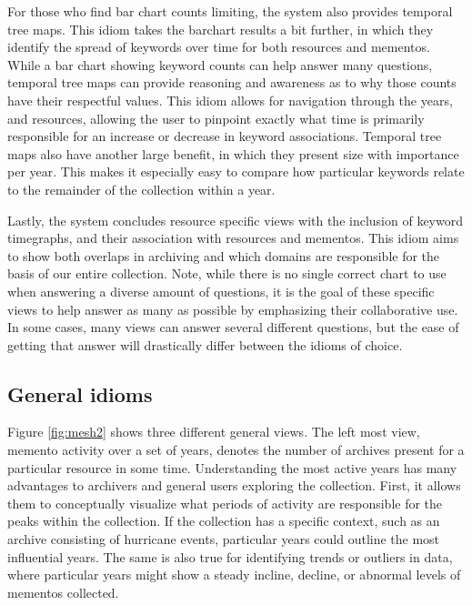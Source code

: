 \documentclass[10pt,journal,compsoc]{IEEEtran}
\begin{document}
For those who find bar chart counts limiting, the system also provides temporal tree maps. This idiom takes the barchart results a bit further, in which they identify the spread of keywords over time for both resources and mementos. While a bar chart showing keyword counts can help answer many questions, temporal tree maps can provide reasoning and awareness as to why those counts have their respectful values. This idiom allows for navigation through the years, and resources, allowing the user to pinpoint exactly what time is primarily responsible for an increase or decrease in keyword associations. Temporal tree maps also have another large benefit, in which they present size with importance per year. This makes it especially easy to compare how particular keywords relate to the remainder of the collection within a year. \par

Lastly, the system concludes resource specific views with the inclusion of keyword timegraphs, and their association with resources and mementos. This idiom aims to show both overlaps in archiving and which domains are responsible for the basis of our entire collection. Note, while there is no single correct chart to use when answering a diverse amount of questions, it is the goal of these specific views to help answer as many as possible by emphasizing their collaborative use. In some cases, many views can answer several different questions, but the ease of getting that answer will drastically differ between the idioms of choice. \par

\subsection{General idioms}
Figure \ref{fig:mesh2} shows three different general views. The left most view, memento activity over a set of years, denotes the number of archives present for a particular resource in some time. Understanding the most active years has many advantages to archivers and general users exploring the collection. First, it allows them to conceptually visualize what periods of activity are responsible for the peaks within the collection. If the collection has a specific context, such as an archive consisting of hurricane events, particular years could outline the most influential years. The same is also true for identifying trends or outliers in data, where particular years might show a steady incline, decline, or abnormal levels of mementos collected. \par
\end{document}
